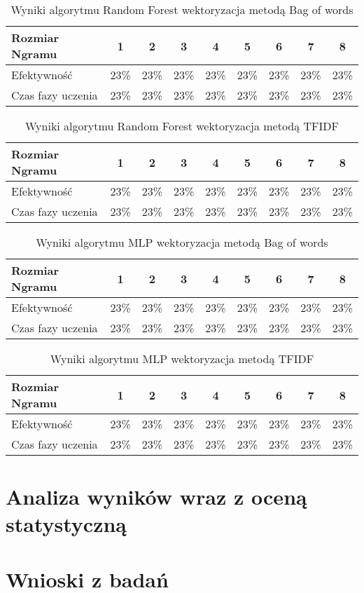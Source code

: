 \begin{table}[h!]
    \centering
    \begin{tabular}{ | l | c | c | c | c | c | c | c | c |}
        \hline
        Rozmiar Ngramu & 1 & 2 & 3 & 4 & 5 & 6 & 7 & 8  \\ \hline
        Efektywność & 23\% & 23\% & 23\% & 23\% & 23\% & 23\% & 23\% & 23\%   \\ \hline
        Czas fazy uczenia & 23\% & 23\% & 23\% & 23\% & 23\% & 23\% & 23\% & 23\%  \\ \hline
    \end{tabular}
    \caption{Wyniki algorytmu Random Forest wektoryzacja metodą Bag of words}
\end{table}

\begin{table}[h!]
    \centering
    \begin{tabular}{ | l | c | c | c | c | c | c | c | c |}
        \hline
        Rozmiar Ngramu & 1 & 2 & 3 & 4 & 5 & 6 & 7 & 8  \\ \hline
        Efektywność & 23\% & 23\% & 23\% & 23\% & 23\% & 23\% & 23\% & 23\%   \\ \hline
        Czas fazy uczenia & 23\% & 23\% & 23\% & 23\% & 23\% & 23\% & 23\% & 23\%  \\ \hline
    \end{tabular}
    \caption{Wyniki algorytmu Random Forest wektoryzacja metodą TFIDF}
\end{table}

\begin{table}[h!]
    \centering
    \begin{tabular}{ | l | c | c | c | c | c | c | c | c |}
        \hline
        Rozmiar Ngramu & 1 & 2 & 3 & 4 & 5 & 6 & 7 & 8  \\ \hline
        Efektywność & 23\% & 23\% & 23\% & 23\% & 23\% & 23\% & 23\% & 23\%   \\ \hline
        Czas fazy uczenia & 23\% & 23\% & 23\% & 23\% & 23\% & 23\% & 23\% & 23\%  \\ \hline
    \end{tabular}
    \caption{Wyniki algorytmu MLP wektoryzacja metodą Bag of words}
\end{table}

\begin{table}[h!]
    \centering
    \begin{tabular}{ | l | c | c | c | c | c | c | c | c |}
        \hline
        Rozmiar Ngramu & 1 & 2 & 3 & 4 & 5 & 6 & 7 & 8  \\ \hline
        Efektywność & 23\% & 23\% & 23\% & 23\% & 23\% & 23\% & 23\% & 23\%   \\ \hline
        Czas fazy uczenia & 23\% & 23\% & 23\% & 23\% & 23\% & 23\% & 23\% & 23\%  \\ \hline
    \end{tabular}
    \caption{Wyniki algorytmu MLP wektoryzacja metodą TFIDF}
\end{table}
\section{Analiza wyników wraz z oceną statystyczną}

\section{Wnioski z badań}

